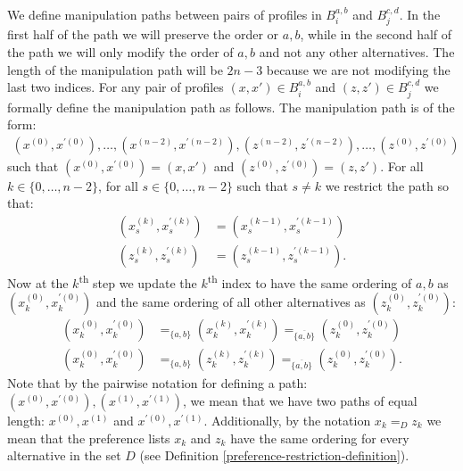 	We define manipulation paths between pairs of profiles in $B^{a,b}_i$ and $B^{c,d}_j$. In the first half of the path we will preserve the order or $a, b$, while in the second half of the path we will only modify the order of $a, b$ and not any other alternatives. The length of the manipulation path will be $2n - 3$ because we are not modifying the last two indices. For any pair of profiles $(x, x') \in B^{a,b}_i$ and $(z, z') \in B^{c,d}_j$ we formally define the manipulation path as follows. The manipulation path is of the form:
	\begin{align*}
		(x^{(0)}, x^{\prime(0)}), \ldots, (x^{(n - 2)}, x^{\prime(n - 2)}), (z^{(n - 2)}, z^{\prime(n - 2)}), \ldots, (z^{(0)}, z^{\prime(0)})
	\end{align*}
	such that $(x^{(0)}, x^{\prime(0)}) = (x, x')$ and $(z^{(0)}, z^{\prime(0)}) = (z, z')$. For all $k \in \{0, \ldots, n - 2\}$, for all $s \in \{0, \ldots, n - 2\}$ such that $s \neq k$ we restrict the path so that:
	\begin{align}
		(x_s^{(k)}, x_s^{\prime(k)}) &= (x_s^{(k-1)}, x_s^{\prime(k-1)}) \label{eq:manipulation-path-rule-1-x} \\
		(z_s^{(k)}, z_s^{\prime(k)}) &= (z_s^{(k-1)}, z_s^{\prime(k-1)}). \label{eq:manipulation-path-rule-1-z}
	\end{align}
	Now at the $k$\textsuperscript{th} step we update the $k$\textsuperscript{th} index to have the same ordering of $a, b$ as $(x_k^{(0)}, x_k^{\prime(0)})$ and the same ordering of all other alternatives as $(z_k^{(0)}, z_k^{\prime(0)})$:
	\begin{align}
		(x_k^{(0)}, x_k^{\prime(0)}) &=_{\{a, b\}} (x_k^{(k)}, x_k^{\prime(k)}) =_{\overline{\{a, b\}}} (z_k^{(0)}, z_k^{\prime(0)}) \label{eq:manipulation-path-rule-2-x} \\
		(x_k^{(0)}, x_k^{\prime(0)}) &=_{\{a, b\}} (z_k^{(k)}, z_k^{\prime(k)}) =_{\overline{\{a, b\}}} (z_k^{(0)}, z_k^{\prime(0)}). \label{eq:manipulation-path-rule-2-z}
	\end{align}
	Note that by the pairwise notation for defining a path: $(x^{(0)}, x^{\prime(0)}), (x^{(1)}, x^{\prime(1)})$, we mean that we have two paths of equal length: $x^{(0)}, x^{(1)}$ and $x^{\prime(0)}, x^{\prime(1)}$. Additionally, by the notation $x_k =_D z_k$ we mean that the preference lists $x_k$ and $z_k$ have the same ordering for every alternative in the set $D$ (see Definition \ref{preference-restriction-definition}).

